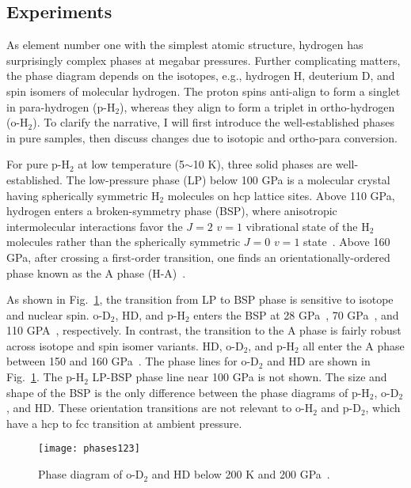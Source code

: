 \subsection{Experiments}
\label{sec:hsolid-expt}

As element number one with the simplest atomic structure, hydrogen has surprisingly complex phases at megabar pressures.
Further complicating matters, the phase diagram depends on the isotopes, e.g., hydrogen H, deuterium D, and spin isomers of molecular hydrogen.
The proton spins anti-align to form a singlet in para-hydrogen (p-H$_2$), whereas they align to form a triplet in ortho-hydrogen (o-H$_2$).
To clarify the narrative, I will first introduce the well-established phases in pure samples, then discuss changes due to isotopic and ortho-para conversion.

For pure p-H$_2$ at low temperature (5$\sim$10 K), three solid phases are well-established. The low-pressure phase (LP) below 100 GPa is a molecular crystal having spherically symmetric H$_2$ molecules on hcp lattice sites. Above 110 GPa, hydrogen enters a broken-symmetry phase (BSP), where anisotropic intermolecular interactions favor the $J=2$ $v=1$ vibrational state of the H$_2$ molecules rather than the spherically symmetric $J=0$ $v=1$ state~\cite{Lorenzana1990}. Above 160 GPa, after crossing a first-order transition, one finds an orientationally-ordered phase known as the A phase (H-A)~\cite{Lorenzana1989}.

As shown in Fig.~\ref{fig:hsolid-phases123}, the transition from LP to BSP phase is sensitive to isotope and nuclear spin. o-D$_2$, HD, and p-H$_2$ enters the BSP at 28 GPa~\cite{Silvera1981}, 70 GPa~\cite{Chijioke2006}, and 110 GPA~\cite{Lorenzana1990}, respectively. In contrast, the transition to the A phase is fairly robust across isotope and spin isomer variants. HD, o-D$_2$, and p-H$_2$ all enter the A phase between 150 and 160 GPa~\cite{Hemley1988,Lorenzana1989,Cui1994,Chijioke2006}. The phase lines for o-D$_2$ and HD are shown in Fig.~\ref{fig:hsolid-phases123}. The p-H$_2$ LP-BSP phase line near 100 GPa is not shown. The size and shape of the BSP is the only difference between the phase diagrams of p-H$_2$, o-D$_2$, and HD.
These orientation transitions are not relevant to o-H$_2$ and p-D$_2$, which have a hcp to fcc transition at ambient pressure.

\begin{figure}[h]
\centering
\texttt{[image: phases123]}
\caption{Phase diagram of o-D$_2$ and HD below 200 K and 200 GPa~\cite{Chijioke2006}.}
\label{fig:hsolid-phases123}
\end{figure}

